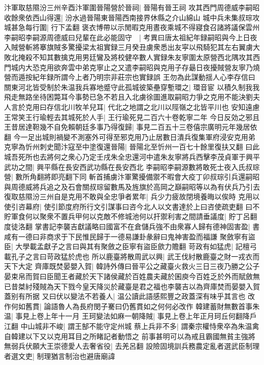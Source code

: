 汴軍取慈隰汾三州辛酉汴軍圍晉陽營於晉祠|{
	晉陽有晉王祠}
攻其西門周德威李嗣昭收餘衆依西山得還|{
	汾水過晉陽東晉陽西南接界休縣之介山綿山}
城中兵未集叔琮攻城甚急每行圍|{
	行下孟翻}
褒衣博帶以示閒暇克用晝夜乘城不得寢食召諸將議保雲州李嗣昭李嗣源周德威曰兒輩在此必能固守　|{
	考異曰唐太祖紀年録嗣昭與今上日夜入賊營斬將搴旗賊多驚擾梁太祖實録三月癸丑虜衆悉出友寜以飛騎犯其左右翼虜大敗北掩殺不知其數擒克用男廷鸞及將校健卒數人實録朱友寧圍太原營西北隅攻其西門城内大恐克用欲奔雲中弟克寧止之又遣李嗣昭與克用子存朂日夜擾賊營友寧乃燒營而遁按紀年録所謂今上者乃明宗非莊宗也實録誤}
王勿為此謀動揺人心李存信曰關東河北皆受制於朱温我兵寡地蹙守此孤城彼築壘穿塹環之|{
	環音宦}
以積久制我我飛走無路坐待困斃耳今事勢已急不若且入北虜徐圖進取嗣昭力爭之克用不能決劉夫人言於克用曰存信北川牧羊兒耳|{
	代北之地謂之北川以陘嶺之北皆平川也}
安知遠慮王常笑王行瑜輕去其城死於人手|{
	王行瑜死見二百六十卷乾寧二年}
今日反効之邪且王昔居達靼幾不自免賴朝廷多事乃得復歸|{
	事見二百五十三卷僖宗廣明元年幾居依翻}
今一足出城則禍變不測塞外可得至邪克用乃止居數日潰兵復集軍府浸安克用弟克寧為忻州刺史聞汴寇至中塗復還晉陽|{
	晉陽北至忻州一百七十餘里復扶又翻}
曰此城吾死所也去將何之衆心乃定壬戌朱全忠還河中遣朱友寧將兵西擊李茂貞軍于興平武功之間|{
	興平縣在長安西武功縣在長安西北}
李嗣昭李嗣源數將敢死士夜入氏叔琮營|{
	數所角翻將即亮翻下同}
斬首捕虜汴軍驚擾備禦不暇會大疫丁卯叔琮引兵還嗣昭與周德威將兵追之及石會關叔琮留數馬及旌旗於高岡之巔嗣昭等以為有伏兵乃引去復取慈隰汾三州自是克用不敢與全忠爭者累年|{
	兵少力疲故閉境養晦以俟時}
克用以使引咨幕府|{
	使引節度府所行文引謀事曰咨今北人以文書達於上曰咨使疏吏翻}
曰不貯軍食何以聚衆不置兵甲何以克敵不修城池何以扞禦利害之間請垂議度|{
	貯丁呂翻度徒洛翻}
掌書記李襲吉獻議略曰國富不在倉儲兵強不由衆寡人歸有德神固害盈|{
	書咸有一德曰非商求于下民惟民歸于一德易謙卦彖辭曰鬼神害盈而福謙}
聚斂寧有盜臣|{
	大學載孟獻子之言曰與其有聚斂之臣寧有盜臣歛力贍翻}
苛政有如猛虎|{
	記檀弓載孔子之言曰苛政猛於虎也}
所以鹿臺將散周武以興|{
	武王伐紂散鹿臺之財一戎衣而天下大定}
齊庫既焚晏嬰入賀|{
	韓詩外傳曰晉平公之藏臺火救火三日三夜乃勝之公子晏束帛而賀曰臣聞王者藏於天下諸侯藏於百姓農夫藏於囷庾今百姓乏於外而賦斂無已昔桀紂殘賊為天下戮今皇天降災於藏臺是君之福也李襲吉以為齊庫焚而晏嬰入賀蓋别有所据}
又曰伏以變法不若養人|{
	温公讀此語感熙豐之政蓋深有味乎其言也}
改作何如舊貫|{
	論語魯人為長府閔子騫曰仍舊貫如之何何必改作}
韓建蓄財無數首事朱温|{
	事見上卷上年十一月}
王珂變法如麻一朝降賊|{
	事見上卷上年正月珂丘何翻降戶江翻}
中山城非不峻|{
	謂王郜不能守定州城}
蔡上兵非不多|{
	謂秦宗權恃衆卒為朱温禽自韓建以下又以克用耳目之所睹記者動悟之}
前事甚明可以為戒且霸國無貧主強將無弱兵伏願大王崇德愛人去奢省役|{
	去羌呂翻}
設險固境訓兵務農定亂者選武臣制理者選文吏|{
	制理猶言制治也避唐廟諱}
